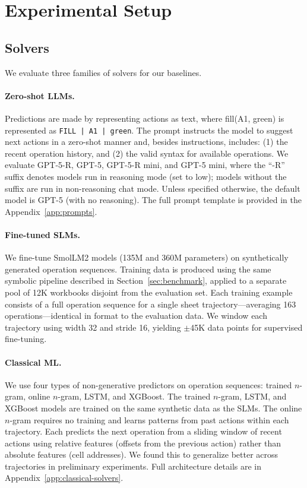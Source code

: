 \documentclass{article}
\newcommand{\op}[1]{\texttt{\small #1}}
\theoremstyle{plain}
\theoremstyle{definition}
\theoremstyle{remark}
\begin{document}
\section{Experimental Setup}\label{sec:setup}

\subsection{Solvers}

We evaluate three families of solvers for our baselines.

\paragraph{Zero-shot LLMs.}
Predictions are made by representing actions as text, where \textsf{\small fill(A1, green)} is represented as \op{FILL | A1 | green}.
The prompt instructs the model to suggest next actions in a zero-shot manner and, besides instructions, includes: (1) the recent operation history, and (2) the valid syntax for available operations.
We evaluate GPT-5-R, GPT-5, GPT-5-R mini, and GPT-5 mini, where the ``-R'' suffix denotes models run in reasoning mode (set to low); models without the suffix are run in non-reasoning chat mode. 
Unless specified otherwise, the default model is GPT-5 (with no reasoning). %
The full prompt template is provided in the Appendix~\ref{app:prompts}. %

\paragraph{Fine-tuned SLMs.}

We fine-tune SmolLM2 models (135M and 360M parameters) on synthetically generated operation sequences. 
Training data is produced using the same symbolic pipeline described in Section~\ref{sec:benchmark}, applied to a separate pool of 12K workbooks disjoint from the evaluation set.
Each training example consists of a full operation sequence for a single sheet trajectory---averaging 163 operations---identical in format to the evaluation data.
We window each trajectory using width 32 and stride 16, yielding $\pm$45K data points for supervised fine-tuning.

\paragraph{Classical ML.}
We use four types of non-generative predictors on operation sequences: trained $n$-gram, online $n$-gram, LSTM, and XGBoost.
The trained $n$-gram, LSTM, and XGBoost models are trained on the same synthetic data as the SLMs.
The online $n$-gram requires no training and learns patterns from past actions within each trajectory.
Each predicts the next operation from a sliding window of recent actions using relative features (offsets from the previous action) rather than absolute features (cell addresses). 
We found this to generalize better across trajectories in preliminary experiments.
Full architecture details are in Appendix~\ref{app:classical-solvers}.
\end{document}
